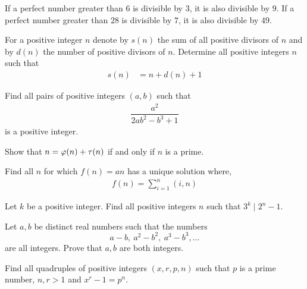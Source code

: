 \documentclass[problems.tex]{subfile}
\begin{document}
	\begin{problem}[Russia $2000$]
		If a perfect number greater than $6$ is divisible by $3$, it is also divisible by $9$. If a perfect number greater than $28$ is divisible by $7$, it is also divisible by $49$.
	\end{problem}
	
	\begin{problem}[Croatia $2014$]
		For a positive integer $n$ denote by $s(n)$ the sum of all positive divisors of $n$ and by $d(n)$ the number of positive divisors of $n$. Determine all positive integers $n$ such that
		\begin{align*}
			s(n) & = n+d(n)+1
		\end{align*}
	\end{problem}
	
	
	\begin{problem}
		Find all pairs of positive integers $(a,b)$ such that
		\begin{align*}
		\dfrac{a^2}{2ab^2-b^3+1}
		\end{align*}
		is a positive integer.
	\end{problem}
	
	\begin{problem}
		Show that $n=\varphi (n)+\tau(n)$ if and only if $n$ is a prime.
	\end{problem}
	
	\begin{problem}
		Find all $n$ for which $f(n)=an$ has a unique solution where,
			\begin{align*}
			f(n)=\sum\limits_{i=1}^n(i,n)
			\end{align*}
	\end{problem}
	
	\begin{problem} 
		Let $k$ be a positive integer. Find all positive integers $n$ such that $3^k \mid 2^n -1.$
	\end{problem}
	
	\begin{problem}
		Let $a,b$ be distinct real numbers such that the numbers
		\[a-b, \ a^2-b^2 , \ a^3-b^3 ,  \ldots\]
		are all integers. Prove that $a,b$ are both integers.
	\end{problem} 
	
	\begin{problem}[MOSP 2001]
		Find all quadruples of positive integers $(x,r,p,n)$ such that $p$ is a prime number, $n,r>1$ and $x^{r} - 1 = p^{n} .$
	\end{problem} 
	
\end{document}
